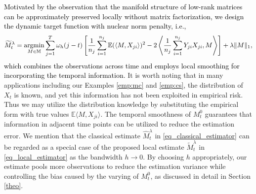 \documentclass[12pt]{article}
\newcommand{\change}[1]{\textcolor{black}{#1}}
\def\argmin{\mathop{\rm argmin}}
\begin{document}
   \change{Motivated by the observation that the manifold structure of low-rank matrices can be approximately preserved locally  without matrix factorization, we design the dynamic target function with nuclear norm penalty, i.e.,}
  \begin{equation}
  \label{eq_local_estimator}
  \widetilde{M}_t^{\lambda}=\argmin_{M\in\mathbb{M}}\sum_{j=1}^T\omega_h(j-t)\left[\frac{1}{n_j}\sum_{i=1}^{n_j}\mathbb{E}(\left\langle M,X_{ji}\right\rangle)^2 - 2\left\langle\frac{1}{n_j}\sum_{i=1}^{n_j}Y_{ji}X_{ji}, M \right\rangle\right] +\lambda \|M\|_1,
  \end{equation}
  \change{which combines the observations across time and employs local smoothing for incorporating the temporal information.}
 It is worth noting that in many applications including our Examples \ref{emp:mc} and \ref{emp:cs},
the distribution of $X_t$ is known, and yet this information has not been exploited in empirical risk. Thus we may utilize the distribution knowledge by substituting the empirical form with true values $\mathbb{E}\langle M, X_{ji}\rangle$.
The temporal smoothness of $M_t^0$ guarantees that information in adjacent time points can be utilized to reduce the estimation error.
  We mention that the classical estimate $\widehat{M}_t^\lambda$ in \eqref{eq_classical_estimator} can be regarded as a special case of the proposed local estimate $\widetilde{M}_t^\lambda$ in \eqref{eq_local_estimator} as %
  the bandwidth $h\rightarrow 0$. 
   By choosing $h$ appropriately, our estimate pools more observations to reduce the estimation variance while controlling the bias caused by the varying of $M_t^0$, as discussed in  detail in Section \ref{theo}.
\end{document}
